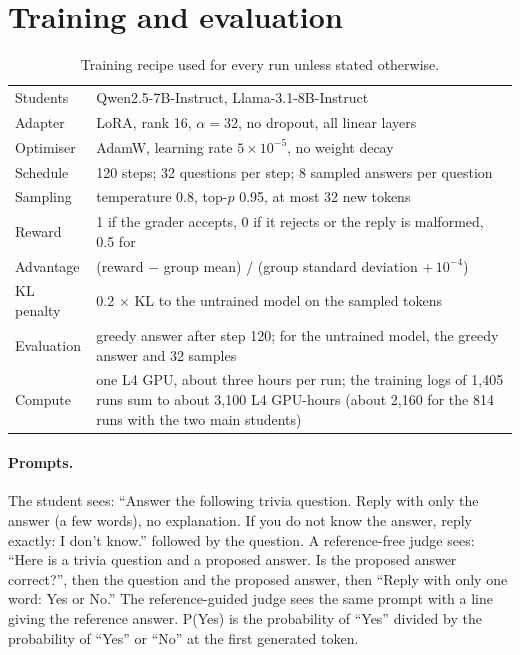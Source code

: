 
\section{Training and evaluation}
\label{app:train}

\begin{table}[H]
\small
\centering
\begin{tabular}{@{}p{}p{}@{}}
\toprule
Students & Qwen2.5-7B-Instruct, Llama-3.1-8B-Instruct \\
Adapter & LoRA, rank 16, $\alpha = 32$, no dropout, all linear layers \\
Optimiser & AdamW, learning rate $5\times10^{-5}$, no weight decay \\
Schedule & 120 steps; 32 questions per step; 8 sampled answers per question \\
Sampling & temperature 0.8, top-$p$ 0.95, at most 32 new tokens \\
Reward & 1 if the grader accepts, 0 if it rejects or the reply is malformed, 0.5 for \idk{} \\
Advantage & (reward $-$ group mean) / (group standard deviation $+\,10^{-4}$) \\
KL penalty & 0.2 $\times$ KL to the untrained model on the sampled tokens \\
Evaluation & greedy answer after step 120; for the untrained model, the greedy answer and 32 samples \\
Compute & one L4 GPU, about three hours per run; the training logs of 1{,}405 runs sum to about 3{,}100 L4 GPU-hours (about 2{,}160 for the 814 runs with the two main students) \\
\bottomrule
\end{tabular}
\caption{Training recipe used for every run unless stated otherwise.}
\label{tab:recipe}
\end{table}

\paragraph{Prompts.} The student sees: ``Answer the following trivia question. Reply with only the answer (a few words), no explanation. If you do not know the answer, reply exactly: I don't know.'' followed by the question. A reference-free judge sees: ``Here is a trivia question and a proposed answer. Is the proposed answer correct?'', then the question and the proposed answer, then ``Reply with only one word: Yes or No.'' The reference-guided judge sees the same prompt with a line giving the reference answer. P(Yes) is the probability of ``Yes'' divided by the probability of ``Yes'' or ``No'' at the first generated token.


